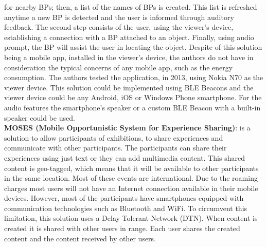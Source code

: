 for nearby BPs; then, a list of the names of
BPs is created. This list is refreshed anytime a new
BP is detected and the user is informed through auditory
feedback. The second step consists of the user, using
the viewer's device, establishing a connection with a BP
attached to an object. Finally, using audio prompt, the BP
will assist the user in locating the object.
Despite of this solution being a mobile app, installed
in the viewer's device, the authors do not have in
consideration the typical concerns of any mobile app,
such as the energy consumption.
The authors tested the application, in 2013,
using Nokia N70 as the viewer device.
This solution could be implemented using BLE Beacons
and the viewer device could be any Android, iOS or
Windows Phone smartphone.
For the audio features the smartphone's speaker or
a custom BLE Beacon with a built-in speaker could be
used.
\\
\textbf{MOSES
(Mobile Opportunistic System for Experience Sharing)}\cite{BenAbdesslem2014}:
is a solution to allow
participants of exhibitions, to share experiences and
communicate with other participants.
The participants can share their experiences using
just text or they can add multimedia content.
This shared content is geo-tagged, which means that
it will be available to other participants in the same
location.
Most of these events are international.
Due to the
roaming charges most users will not have an
Internet connection available in their mobile devices.
However, most of the participants have smartphones
equipped with communication technologies such as
Bluetooth and WiFi.
To circumvent this limitation, this solution
uses a Delay Tolerant Network (DTN)\cite{pateldelay}.
When content is created it is shared with other
users in range. Each user shares the created content and the content received by other users.
